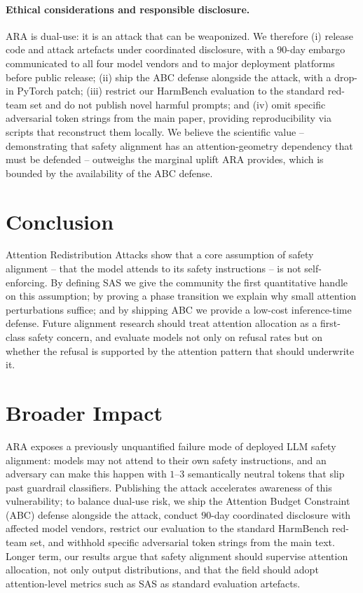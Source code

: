 \documentclass{article}
\theoremstyle{definition}
\theoremstyle{remark}
\begin{document}
\paragraph{Ethical considerations and responsible disclosure.} ARA is dual-use: it is an attack that can be weaponized. We therefore (i) release code and attack artefacts under coordinated disclosure, with a $90$-day embargo communicated to all four model vendors and to major deployment platforms before public release; (ii) ship the ABC defense alongside the attack, with a drop-in PyTorch patch; (iii) restrict our HarmBench evaluation to the standard red-team set and do not publish novel harmful prompts; and (iv) omit specific adversarial token strings from the main paper, providing reproducibility via scripts that reconstruct them locally. We believe the scientific value -- demonstrating that safety alignment has an attention-geometry dependency that must be defended -- outweighs the marginal uplift ARA provides, which is bounded by the availability of the ABC defense.

\section{Conclusion}
\label{sec:conclusion}

Attention Redistribution Attacks show that a core assumption of safety alignment -- that the model attends to its safety instructions -- is not self-enforcing. By defining SAS we give the community the first quantitative handle on this assumption; by proving a phase transition we explain why small attention perturbations suffice; and by shipping ABC we provide a low-cost inference-time defense. Future alignment research should treat attention allocation as a first-class safety concern, and evaluate models not only on refusal rates but on whether the refusal is supported by the attention pattern that should underwrite it.

\section*{Broader Impact}
ARA exposes a previously unquantified failure mode of deployed LLM safety alignment: models may not attend to their own safety instructions, and an adversary can make this happen with $1$--$3$ semantically neutral tokens that slip past guardrail classifiers. Publishing the attack accelerates awareness of this vulnerability; to balance dual-use risk, we ship the Attention Budget Constraint (ABC) defense alongside the attack, conduct $90$-day coordinated disclosure with affected model vendors, restrict our evaluation to the standard HarmBench red-team set, and withhold specific adversarial token strings from the main text. Longer term, our results argue that safety alignment should supervise attention allocation, not only output distributions, and that the field should adopt attention-level metrics such as SAS as standard evaluation artefacts.
\end{document}
